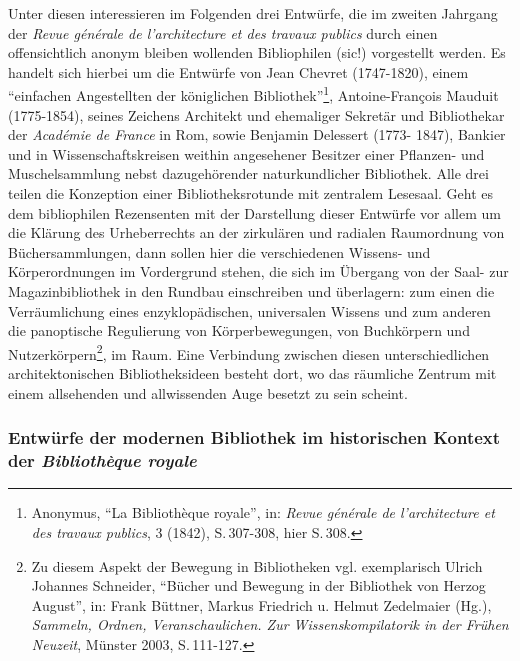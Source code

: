 Unter diesen interessieren im Folgenden drei Entwürfe, die im zweiten
Jahrgang der \emph{Revue générale de l'architecture et des travaux
publics} durch einen offensichtlich anonym bleiben wollenden
Bibliophilen (sic!) vorgestellt werden. Es handelt sich hierbei um die
Entwürfe von Jean Chevret (1747-1820), einem \enquote{einfachen
Angestellten der königlichen Bibliothek}\footnote{Anonymus, \enquote{La
  Bibliothèque royale}, in: \emph{Revue générale de l'architecture et
  des travaux publics}, 3 (1842), S.\,307-308, hier S.\,308.},
Antoine-François Mauduit (1775-1854), seines Zeichens Architekt und
ehemaliger Sekretär und Bibliothekar der \emph{Académie de France} in
Rom, sowie Benjamin Delessert (1773- 1847), Bankier und in
Wissenschaftskreisen weithin angesehener Besitzer einer Pflanzen- und
Muschelsammlung nebst dazugehörender naturkundlicher Bibliothek. Alle
drei teilen die Konzeption einer Bibliotheksrotunde mit zentralem
Lesesaal. Geht es dem bibliophilen Rezensenten mit der Darstellung
dieser Entwürfe vor allem um die Klärung des Urheberrechts an der
zirkulären und radialen Raumordnung von Büchersammlungen, dann sollen
hier die verschiedenen Wissens- und Körperordnungen im Vordergrund
stehen, die sich im Übergang von der Saal- zur Magazinbibliothek in den
Rundbau einschreiben und überlagern: zum einen die Verräumlichung eines
enzyklopädischen, universalen Wissens und zum anderen die panoptische
Regulierung von Körperbewegungen, von Buchkörpern und
Nutzerkörpern\footnote{Zu diesem Aspekt der Bewegung in Bibliotheken
  vgl. exemplarisch Ulrich Johannes Schneider, \enquote{Bücher und
  Bewegung in der Bibliothek von Herzog August}, in: Frank Büttner,
  Markus Friedrich u. Helmut Zedelmaier (Hg.), \emph{Sammeln, Ordnen,
  Veranschaulichen. Zur Wissenskompilatorik in der Frühen Neuzeit},
  Münster 2003, S.\,111-127.}, im Raum. Eine Verbindung zwischen diesen
unterschiedlichen architektonischen Bibliotheksideen besteht dort, wo
das räumliche Zentrum mit einem allsehenden und allwissenden Auge
besetzt zu sein scheint.

\subsubsection{\texorpdfstring{Entwürfe der modernen Bibliothek im
historischen Kontext der \emph{Bibliothèque
royale}}{Entwürfe der modernen Bibliothek im historischen Kontext der Bibliothèque royale}}\label{entwuxfcrfe-der-modernen-bibliothek-im-historischen-kontext-der-bibliothuxe8que-royale}

